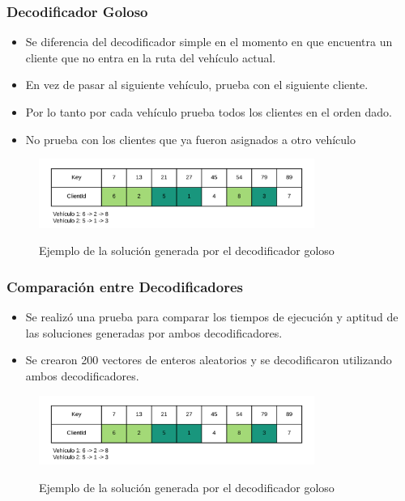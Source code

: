 \documentclass{beamer}
\begin{document}
\begin{frame}
\frametitle{Decodificador Goloso}

\begin{itemize}
    \item Se diferencia del decodificador simple en el momento en que encuentra un cliente que no entra en la ruta del vehículo actual.
    \pause
    \item En vez de pasar al siguiente vehículo, prueba con el siguiente cliente.
    \pause
    \item Por lo tanto por cada vehículo prueba todos los clientes en el orden dado.
    \pause
    \item No prueba con los clientes que ya fueron asignados a otro vehículo
    \pause
\end{itemize}

\begin{figure}[h]
	\caption{Ejemplo de la solución generada por el decodificador goloso}
	\centering
	\includegraphics[width=9cm]{DistribucionClientesDecoGoloso}
	\label{fig:DistribucionClientesDecoGoloso}
\end{figure}

\end{frame}


\begin{frame}
\frametitle{Comparación entre Decodificadores}

\begin{itemize}
    \item Se realizó una prueba para comparar los tiempos de ejecución y aptitud de las soluciones generadas por ambos decodificadores.
    \pause
    \item Se crearon 200 vectores de enteros aleatorios y se decodificaron utilizando ambos decodificadores.
    \pause
\end{itemize}

\begin{figure}[h]
	\caption{Ejemplo de la solución generada por el decodificador goloso}
	\centering
	\includegraphics[width=9cm]{DistribucionClientesDecoGoloso}
	\label{fig:DistribucionClientesDecoGoloso}
\end{figure}

\end{frame}
\end{document}
